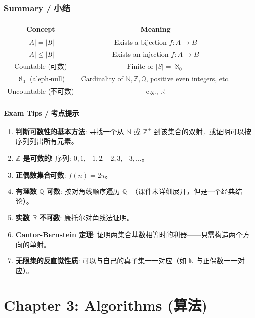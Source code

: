 \documentclass[10pt,a4paper,openany]{ctexbook}
\theoremstyle{definition}
\theoremstyle{remark}
\begin{document}
\subsection{Summary / 小结}

\begin{center}
\begin{tabular}{cc}
\hline
Concept & Meaning \\ \hline
$|A| = |B|$ & Exists a bijection $f: A \to B$ \\
$|A| \le |B|$ & Exists an injection $f: A \to B$ \\
Countable (可数) & Finite or $|S| = \aleph_0$ \\
$\aleph_0$ (aleph-null) & Cardinality of $\mathbb{N}, \mathbb{Z}, \mathbb{Q}$, positive even integers, etc. \\
Uncountable (不可数) & e.g., $\mathbb{R}$ \\
\hline
\end{tabular}

\end{center}

\subsubsection{Exam Tips / 考点提示}

\begin{enumerate}
\item \textbf{判断可数性的基本方法}: 寻找一个从 $\mathbb{N}$ 或 $\mathbb{Z}^+$ 到该集合的双射，或证明可以按序列列出所有元素。
\item \textbf{$\mathbb{Z}$ 是可数的!} 序列: $0, 1, -1, 2, -2, 3, -3, \dots$。
\item \textbf{正偶数集合可数}: $f(n) = 2n$。
\item \textbf{有理数 $\mathbb{Q}$ 可数}: 按对角线顺序遍历 $\mathbb{Q}^+$（课件未详细展开，但是一个经典结论）。
\item \textbf{实数 $\mathbb{R}$ 不可数}: 康托尔对角线法证明。
\item \textbf{Cantor-Bernstein 定理}: 证明两集合基数相等时的利器——只需构造两个方向的单射。
\item \textbf{无限集的反直觉性质}: 可以与自己的真子集一一对应（如 $\mathbb{N}$ 与正偶数一一对应）。

\end{enumerate}

\chapter{Chapter 3: Algorithms (算法)}
\end{document}
